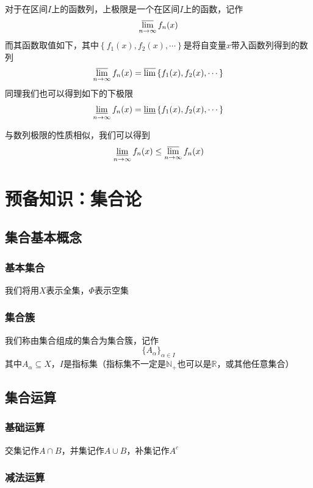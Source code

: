 \documentclass{ctexbook}
\newcommand{\R}{\mathbb{R}}
\begin{document}
对于在区间$I$上的函数列，上极限是一个在区间$I$上的函数，记作
\[
	\varlimsup_{n\to\infty} f_n(x)
\]
而其函数取值如下，其中$\left\{f_1(x),f_2(x),\cdots\right\}$是将自变量$x$带入函数列得到的数列
\[
	\varlimsup_{n\to\infty} f_n(x) = \varlimsup\left\{f_1(x),f_2(x),\cdots\right\}
\]
同理我们也可以得到如下的下极限
\[
	\varliminf_{n\to\infty} f_n(x) = \varliminf\left\{f_1(x),f_2(x),\cdots\right\}
\]
\smallskip

与数列极限的性质相似，我们可以得到
\[
	\varliminf_{n\to\infty} f_n(x) \le \varlimsup_{n\to\infty} f_n(x)
\]
\bigskip

\section{预备知识：集合论}

\subsection{集合基本概念}

\subsubsection{基本集合}

我们将用$X$表示全集，$\Phi$表示空集

\subsubsection{集合簇}

我们称由集合组成的集合为集合簇，记作
\[
	\{A_\alpha\}_{\alpha\in I}
\]
其中$A_\alpha \subseteq X$，$I$是指标集（指标集不一定是$\mathbb{N}_+$也可以是$\R$，或其他任意集合）

\subsection{集合运算}

\subsubsection{基础运算}

交集记作$A\cap B$，并集记作$A\cup B$，补集记作$A^c$

\subsubsection{减法运算}
\end{document}
